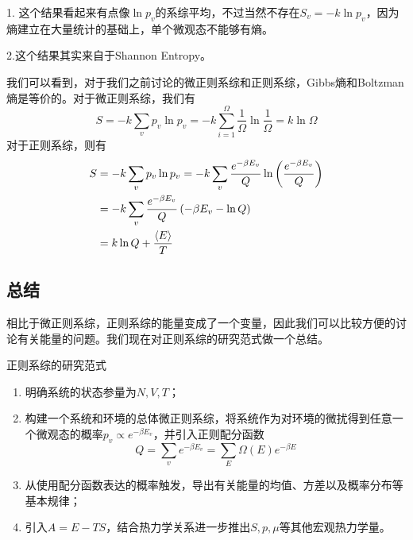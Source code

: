 \begin{remark}
      1. 这个结果看起来有点像$\ln p_v$的系综平均，不过当然不存在$S_v=-k\ln p_v$，因为熵建立在大量统计的基础上，单个微观态不能够有熵。

      \noindent 2.这个结果其实来自于Shannon Entropy。
\end{remark}

我们可以看到，对于我们之前讨论的微正则系综和正则系综，Gibbs熵和Boltzman熵是等价的。对于微正则系综，我们有\begin{equation}
       S=-k\sum_v p_v \ln p_v=-k\sum_{i=1}^\Omega \frac{1}{\Omega}\ln \frac{1}{\Omega}= k\ln \Omega
\end{equation}
对于正则系综，则有\begin{equation}
\begin{aligned}
       S&=-k \sum_v p_v \ln p_v=-k\sum_v \frac{e^{-\beta E_v}}{Q}\ln\left(\frac{e^{-\beta E_v}}{Q}\right)\\
       &=-k\sum_v \frac{e^{-\beta E_v}}{Q}\left(-\beta E_v -\ln Q\right)\\
       &=k\ln Q+\frac{\braket{E}}{T}
\end{aligned}
\end{equation}

\subsection{总结} %
\label{sub:2.1总结}
相比于微正则系综，正则系综的能量变成了一个变量，因此我们可以比较方便的讨论有关能量的问题。我们现在对正则系综的研究范式做一个总结。
\begin{pointlist}{正则系综的研究范式}
       \begin{enumerate}
              \item 明确系统的状态参量为$N,V,T$；
              \item 构建一个系统和环境的总体微正则系综，将系统作为对环境的微扰得到任意一个微观态的概率$\displaystyle p_v\propto e^{-\beta E_v}$，并引入正则配分函数\begin{equation}
                     Q=\sum_v e^{-\beta E_v}=\sum_E \Omega(E) e^{-\beta E}
              \end{equation}
              \item 从使用配分函数表达的概率触发，导出有关能量的均值、方差以及概率分布等基本规律；
              \item 引入$A=E-TS$，结合热力学关系进一步推出$S,p,\mu$等其他宏观热力学量。
       \end{enumerate}
\end{pointlist}

